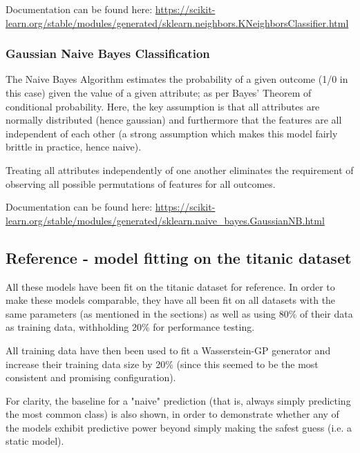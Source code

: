Documentation can be found here: \url{https://scikit-learn.org/stable/modules/generated/sklearn.neighbors.KNeighborsClassifier.html}

\subsubsection{Gaussian Naive Bayes Classification}

The Naive Bayes Algorithm estimates the probability of a given outcome (1/0 in this case) given the value of a given attribute; as per Bayes' Theorem of conditional probability.
Here, the key assumption is that all attributes are normally distributed (hence gaussian) 
and furthermore that the features are all independent of each other (a strong assumption which makes this model fairly brittle in practice, hence naive).

Treating all attributes independently of one another eliminates the requirement of observing all possible permutations of features for all outcomes.

Documentation can be found here: \url{https://scikit-learn.org/stable/modules/generated/sklearn.naive_bayes.GaussianNB.html}

\clearpage

\subsection{Reference - model fitting on the titanic dataset}

All these models have been fit on the titanic dataset for reference. In order to make these models comparable, they have all been fit on all datasets with the same parameters (as mentioned in the sections) as well as 
using 80\% of their data as training data, withholding 20\% for performance testing.

All training data have then been used to fit a Wasserstein-GP generator and increase their training data size by 20\% (since this seemed to be the most consistent and promising configuration).

For clarity, the baseline for a "naive" prediction (that is, always simply predicting the most common class) is also shown, 
in order to demonstrate whether any of the models exhibit predictive power beyond simply making the safest guess (i.e. a static model).


